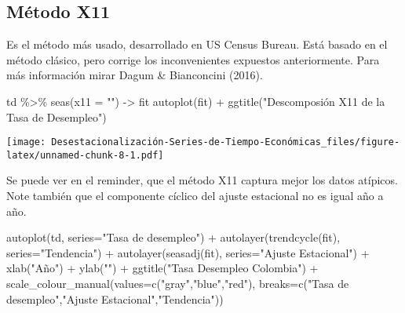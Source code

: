 \documentclass[
]{article}
\newenvironment{Shaded}{\begin{snugshade}}{\end{snugshade}}
\newcommand{\AttributeTok}[1]{\textcolor[rgb]{0.77,0.63,0.00}{#1}}
\newcommand{\FunctionTok}[1]{\textcolor[rgb]{0.00,0.00,0.00}{#1}}
\newcommand{\NormalTok}[1]{#1}
\newcommand{\OtherTok}[1]{\textcolor[rgb]{0.56,0.35,0.01}{#1}}
\newcommand{\SpecialCharTok}[1]{\textcolor[rgb]{0.00,0.00,0.00}{#1}}
\newcommand{\StringTok}[1]{\textcolor[rgb]{0.31,0.60,0.02}{#1}}
\begin{document}
\hypertarget{muxe9todo-x11}{%
\subsection{Método X11}\label{muxe9todo-x11}}

Es el método más usado, desarrollado en US Census Bureau. Está basado en
el método clásico, pero corrige los inconvenientes expuestos
anteriormente. Para más información mirar Dagum \& Bianconcini (2016).

\begin{Shaded}
\begin{Highlighting}[]
\NormalTok{td }\SpecialCharTok{\%\textgreater{}\%} \FunctionTok{seas}\NormalTok{(}\AttributeTok{x11 =} \StringTok{""}\NormalTok{) }\OtherTok{{-}\textgreater{}}\NormalTok{ fit}
\FunctionTok{autoplot}\NormalTok{(fit) }\SpecialCharTok{+}
  \FunctionTok{ggtitle}\NormalTok{(}\StringTok{"Descomposión X11 de la Tasa de Desempleo"}\NormalTok{)}
\end{Highlighting}
\end{Shaded}

\texttt{[image: Desestacionalización-Series-de-Tiempo-Económicas\_files/figure-latex/unnamed-chunk-8-1.pdf]}

Se puede ver en el reminder, que el método X11 captura mejor los datos
atípicos. Note también que el componente cíclico del ajuste estacional
no es igual año a año.

\begin{Shaded}
\begin{Highlighting}[]
\FunctionTok{autoplot}\NormalTok{(td, }\AttributeTok{series=}\StringTok{"Tasa de desempleo"}\NormalTok{) }\SpecialCharTok{+}
  \FunctionTok{autolayer}\NormalTok{(}\FunctionTok{trendcycle}\NormalTok{(fit), }\AttributeTok{series=}\StringTok{"Tendencia"}\NormalTok{) }\SpecialCharTok{+}
  \FunctionTok{autolayer}\NormalTok{(}\FunctionTok{seasadj}\NormalTok{(fit), }\AttributeTok{series=}\StringTok{"Ajuste Estacional"}\NormalTok{) }\SpecialCharTok{+}
  \FunctionTok{xlab}\NormalTok{(}\StringTok{"Año"}\NormalTok{) }\SpecialCharTok{+} \FunctionTok{ylab}\NormalTok{(}\StringTok{""}\NormalTok{) }\SpecialCharTok{+}
  \FunctionTok{ggtitle}\NormalTok{(}\StringTok{"Tasa Desempleo Colombia"}\NormalTok{) }\SpecialCharTok{+}
  \FunctionTok{scale\_colour\_manual}\NormalTok{(}\AttributeTok{values=}\FunctionTok{c}\NormalTok{(}\StringTok{"gray"}\NormalTok{,}\StringTok{"blue"}\NormalTok{,}\StringTok{"red"}\NormalTok{),}
             \AttributeTok{breaks=}\FunctionTok{c}\NormalTok{(}\StringTok{"Tasa de desempleo"}\NormalTok{,}\StringTok{"Ajuste Estacional"}\NormalTok{,}\StringTok{"Tendencia"}\NormalTok{))}
\end{Highlighting}
\end{Shaded}
\end{document}
